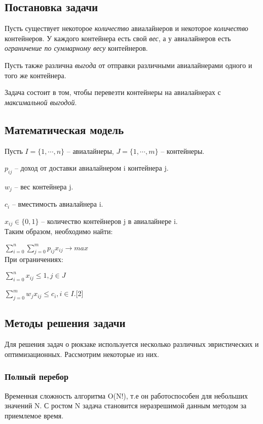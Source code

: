 \documentclass[14pt,a4paper]{extarticle}
\begin{document}
\subsection{Постановка задачи}

	Пусть существует некоторое \emph{количество} авиалайнеров и некоторое \emph{количество} контейнеров. У каждого контейнера есть свой \emph{вес}, а у авиалайнеров есть \emph{ограничение по суммарному весу} контейнеров.
	
	Пусть также различна \emph{выгода} от отправки различными авиалайнерами одного и того же контейнера.
	
	Задача состоит в том, чтобы перевезти контейнеры на авиалайнерах с \emph{максимальной выгодой}. 

\subsection{Математическая модель}

	Пусть $I = \{1,\cdots, n\}$ -- авиалайнеры, $J = \{1,\cdots, m\}$ -- контейнеры.
	
	$p_{ij}$ -- доход от доставки авиалайнером i контейнера j.
	
	$w_{j}$ -- вес контейнера j.
	
	$c_{i}$ -- вместимость авиалайнера i.
	
	$x_{ij} \in \{0,1\}$ -- количество контейнеров j в авиалайнере i.
	\\
	Таким образом, необходимо найти:
	
	$\sum\limits_{i=0}^{n}\sum\limits_{j=0}^{m}p_{ij}x_{ij} \to max$
	\\
	При ограничениях: 
	
	$\sum\limits_{i=0}^{n}x_{ij} \le 1, j \in J$
	
	
	$\sum\limits_{j=0}^{m}w_{j}x_{ij} \le c_{i}, i \in I$.[2]
	
	
\subsection{Методы решения задачи}

	Для решения задач о рюкзаке используется несколько различных эвристических и оптимизационных. Рассмотрим некоторые из них.
	
	\subsubsection{Полный перебор}
	
		Временная сложность алгоритма O(N!), т.е он работоспособен для небольших значений N. С ростом N задача становится неразрешимой данным методом за приемлемое время.
	
\end{document}
